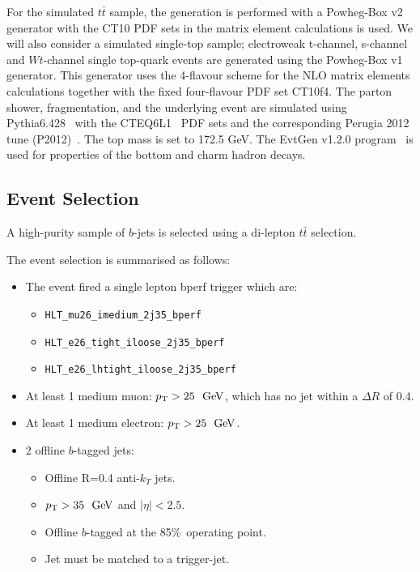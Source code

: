 For the simulated $t\bar{t}$ sample, the generation is performed with
a Powheg-Box v2~\cite{trig-powheg} generator with the CT10 PDF sets in the matrix element calculations is used.
We will also consider a simulated single-top sample;
electroweak t-channel, s-channel and $Wt$-channel single top-quark events are generated using the Powheg-Box v1 generator.
This generator uses the 4-flavour scheme for the NLO matrix elements calculations together with the fixed four-flavour PDF set CT10f4.
The parton shower, fragmentation, and the underlying event are simulated using Pythia6.428~\cite{trig-pythia6} with the CTEQ6L1~\cite{trig-CTEQ6L1} PDF sets
and the corresponding Perugia 2012 tune (P2012)~\cite{trig-perugia}.
The top mass is set to 172.5 GeV.
The EvtGen v1.2.0 program~\cite{trig-evtGen} is used for properties of the bottom and charm hadron decays. \\

\subsection{Event Selection}

A high-purity sample of $b$-jets is selected using a di-lepton $t\bar{t}$ selection.

\noindent
The event selection is summarised as follows:

\begin{itemize}
\item The event fired a single lepton bperf trigger which are:
    \begin{itemize}[label={$-$}]
      \item\verb|HLT_mu26_imedium_2j35_bperf|
      \item\verb|HLT_e26_tight_iloose_2j35_bperf|
      \item\verb|HLT_e26_lhtight_iloose_2j35_bperf|
    \end{itemize}
\item At least 1 medium muon: $\pT>25~\GeV$, which has no jet within a $\Delta R$ of 0.4.
\item At least 1 medium electron: $\pT>25~\GeV$.
\item 2 offline $b$-tagged jets:
   \begin{itemize}[label={$-$}]
     \item Offline R=0.4 anti-$k_T$ jets.
     \item $\pT>35~\GeV$ and $|\eta|<2.5$.
     \item Offline $b$-tagged at the 85\%~operating point.
     \item Jet must be matched to a trigger-jet.
    \end{itemize}
\end{itemize}
\vspace{1em}

